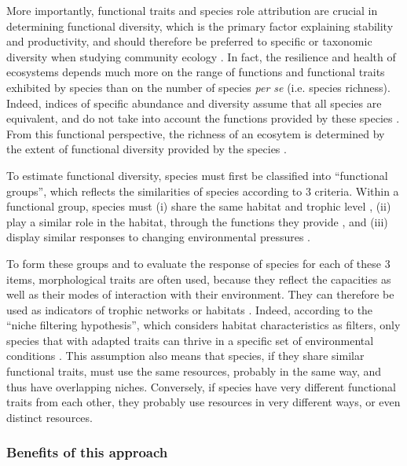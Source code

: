 More importantly, functional traits and species role attribution are crucial in determining functional diversity, which is the primary factor explaining stability and productivity, and should therefore be preferred to specific or taxonomic diversity when studying community ecology \citep{dumay2004,mejri2009}. In fact, the resilience and health of ecosystems depends much more on the range of functions and functional traits exhibited by species than on the number of species \textit{per se} (i.e. species richness). Indeed, indices of specific abundance and diversity assume that all species are equivalent, and do not take into account the functions provided by these species \citep{mejri2009}. From this functional perspective, the richness of an ecosytem is determined by the extent of functional diversity provided by the species \citep{rocklin2004}. 

To estimate functional diversity, species must first be classified into ``functional groups'', which reflects the similarities of species according to 3 criteria. Within a functional group, species must (i) share the same habitat and trophic level \citep{brindamour2016}, (ii) play a similar role in the habitat, through the functions they provide \citep{dumay2004,mejri2009}, and (iii) display similar responses to changing environmental pressures \citep{brindamour2016,dumay2004,mejri2009}.

To form these groups and to evaluate the response of species for each of these 3 items, morphological traits are often used, because they reflect the capacities as well as their modes of interaction with their environment. They can therefore be used as indicators of trophic networks or habitats \citep{brindamour2016}. Indeed, according to the “niche filtering hypothesis”, which considers habitat characteristics as filters, only species that with adapted traits can thrive in a specific set of environmental conditions \citep{brindamour2011,zobel1997}. This assumption also means that species, if they share similar functional traits, must use the same resources, probably in the same way, and thus have overlapping niches. Conversely, if species have very different functional traits from each other, they probably use resources in very different ways, or even distinct resources. 

\subsubsection{Benefits of this approach}

